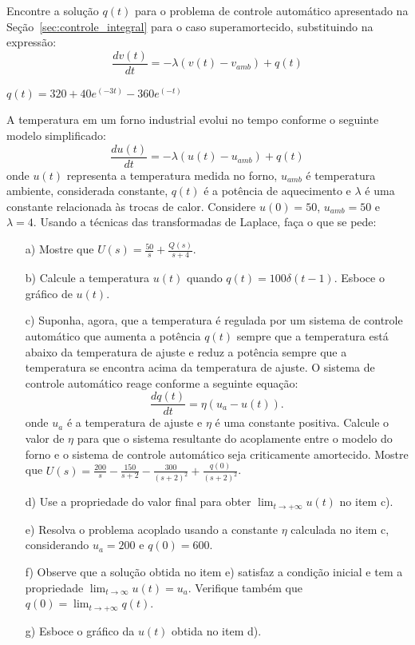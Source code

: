 \begin{exer}
       Encontre a solução $q(t)$ para o problema de controle automático apresentado na Seção~\ref{sec:controle_integral} para o caso superamortecido, substituindo na expressão:
       \begin {equation}
        \frac {d v(t)}{dt}=-\lambda (v(t)-v_{amb}) + q(t)
      \end {equation}
\end{exer}
\begin{resp}
       $q(t)=320 + 40 e^(-3 t) - 360 e^(-t)$
\end{resp}
\begin{exer}A temperatura em um forno industrial evolui no tempo conforme o seguinte modelo simplificado:
\begin{equation}\frac{d u(t)}{dt}=-\lambda (u(t)-u_{amb}) + q(t)\end{equation}
onde $u(t)$ representa a temperatura medida no forno, $u_{amb}$ é temperatura ambiente, considerada constante, $q(t)$ é a potência de aquecimento e $\lambda$ é uma constante relacionada às trocas de calor. Considere $u(0)=50$, $u_{amb}=50$ e $\lambda=4$. Usando a técnicas das transformadas de Laplace, faça o que se pede:
\begin{itemize}
 \item [a)] Mostre que $U(s)=\frac{50}{s}+\frac{Q(s)}{s+4}$.
 \item [b)] Calcule a temperatura $u(t)$ quando  $q(t)=100 \delta(t-1)$. Esboce o gráfico de $u(t)$.
 \item [c)] Suponha, agora, que a temperatura é regulada por um sistema de controle automático que aumenta a potência $q(t)$ sempre que a temperatura está abaixo da temperatura de ajuste e reduz a potência sempre que a temperatura se encontra acima da temperatura de ajuste. O sistema de controle automático reage conforme a seguinte equação:
 \begin{equation}\frac{dq(t)}{dt} = \eta (u_a-u(t)).\end{equation}
 onde $u_a$ é a temperatura de ajuste e $\eta$ é uma constante positiva. Calcule o valor de $\eta$ para que o sistema resultante do acoplamente entre o modelo do forno e o sistema de controle automático seja criticamente amortecido. Mostre que $U(s)=\frac{200}{s}-\frac{150}{s+2}-\frac{300}{(s+2)^2}+\frac{q(0)}{(s+2)^2}$.
 \item[d)] Use a propriedade do valor final para obter $\displaystyle\lim_{t\to+\infty} u(t)$ no item c).
 \item[e)] Resolva o problema acoplado usando a constante $\eta$ calculada no item c, considerando $u_a=200$ e $q(0)=600$.
  \item[f)] Observe que a solução obtida no item e) satisfaz a condição inicial e tem a propriedade $\displaystyle\lim_{t\to \infty}u(t)=u_a$. Verifique também que $q(0)=\lim_{t\to+\infty} q(t)$.
 \item [g)] Esboce o gráfico da $u(t)$ obtida no item d).
 \end{itemize}
\end{exer}
